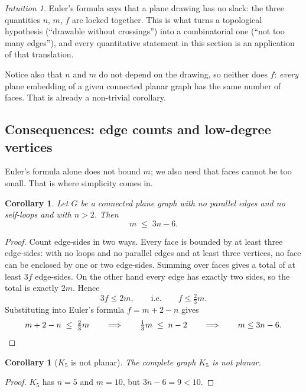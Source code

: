 \documentclass[11pt,a4paper]{article}
\theoremstyle{plain}
\newtheorem{corollary}[theorem]{Corollary}
\theoremstyle{definition}
\theoremstyle{remark}
\newtheorem*{intuition}{Intuition}
\begin{document}
\begin{intuition}
Euler's formula says that a plane drawing has no slack: the three quantities
$n$, $m$, $f$ are locked together. This is what turns a topological hypothesis
(``drawable without crossings'') into a combinatorial one (``not too many
edges''), and every quantitative statement in this section is an application of
that translation.

Notice also that $n$ and $m$ do not depend on the drawing, so neither does $f$:
\emph{every} plane embedding of a given connected planar graph has the same
number of faces. That is already a non-trivial corollary.
\end{intuition}

\subsection{Consequences: edge counts and low-degree vertices}

Euler's formula alone does not bound $m$; we also need that faces cannot be
too small. That is where simplicity comes in.

\begin{corollary}\label{cor:3n-6}
Let $G$ be a connected plane graph with no parallel edges and no self-loops
and with $n > 2$. Then
\[
  m \;\le\; 3n - 6 .
\]
\end{corollary}

\begin{proof}
Count edge-sides in two ways. Every face is bounded by at least three
edge-sides: with no loops and no parallel edges and at least three vertices,
no face can be enclosed by one or two edge-sides. Summing over faces gives a
total of at least $3f$ edge-sides. On the other hand every edge has exactly two
sides, so the total is exactly $2m$. Hence
\[
  3f \le 2m, \qquad\text{i.e.}\qquad f \le \tfrac{2}{3}m .
\]
Substituting into Euler's formula $f = m + 2 - n$ gives
\[
  m + 2 - n \;\le\; \tfrac{2}{3} m
  \qquad\Longrightarrow\qquad
  \tfrac{1}{3} m \;\le\; n - 2
  \qquad\Longrightarrow\qquad
  m \le 3n - 6 . \qedhere
\]
\end{proof}

\begin{corollary}[$K_5$ is not planar]\label{cor:k5}
The complete graph $K_5$ is not planar.
\end{corollary}

\begin{proof}
$K_5$ has $n = 5$ and $m = 10$, but $3n - 6 = 9 < 10$.
\end{proof}
\end{document}
